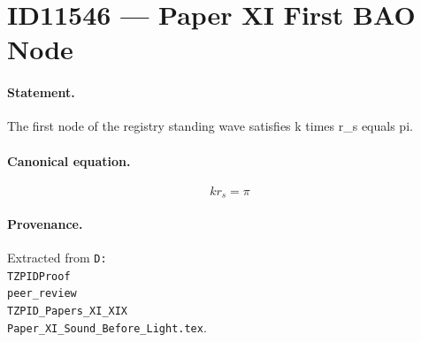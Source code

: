 \section*{ID11546 --- Paper XI First BAO Node}

\paragraph{Statement.}
The first node of the registry standing wave satisfies k times r_s equals pi.

\paragraph{Canonical equation.}
\[
k r_s=\pi
\]

\paragraph{Provenance.}
Extracted from \texttt{D:\\TZPIDProof\\peer\_review\\TZPID\_Papers\_XI\_XIX\\Paper\_XI\_Sound\_Before\_Light.tex}.
